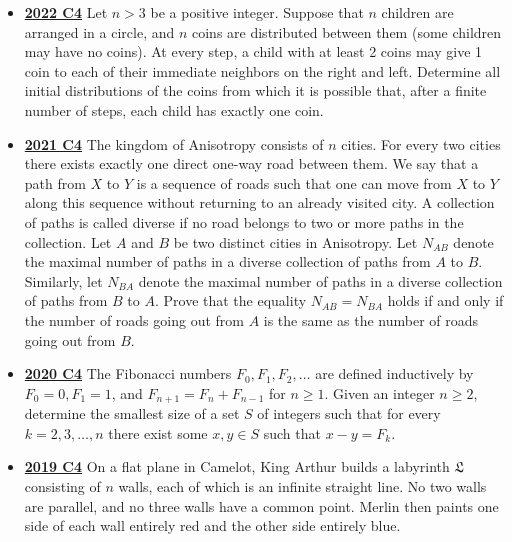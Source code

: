 \documentclass[11pt]{scrartcl}
\begin{document}
\begin{itemize}[leftmargin=*]
Determine the smallest number of pieces Paul needs to make in order to accomplish this.
\item \href{https://artofproblemsolving.com/community/c6h3107331p28104263}{\textbf{2022 C4}} Let $n > 3$ be a positive integer. Suppose that $n$ children are arranged in a circle, and $n$ coins are distributed between them (some children may have no coins). At every step, a child with at least 2 coins may give 1 coin to each of their immediate neighbors on the right and left. Determine all initial distributions of the coins from which it is possible that, after a finite number of steps, each child has exactly one coin. 
\item \href{https://artofproblemsolving.com/community/c6h2882594p25627941}{\textbf{2021 C4}} The kingdom of Anisotropy consists of $n$ cities. For every two cities there exists exactly one direct one-way road between them. We say that a path from $X$ to $Y$ is a sequence of roads such that one can move from $X$ to $Y$ along this sequence without returning to an already visited city. A collection of paths is called diverse if no road belongs to two or more paths in the collection.
Let $A$ and $B$ be two distinct cities in Anisotropy. Let $N_{AB}$ denote the maximal number of paths in a diverse collection of paths from $A$ to $B$. Similarly, let $N_{BA}$ denote the maximal number of paths in a diverse collection of paths from $B$ to $A$. Prove that the equality $N_{AB} = N_{BA}$ holds if and only if the number of roads going out from $A$ is the same as the number of roads going out from $B$. 

\newpage

\item \href{https://artofproblemsolving.com/community/c6h2625914p22698447}{\textbf{2020 C4}} 	The Fibonacci numbers $F_0, F_1, F_2, \dots $ are defined inductively by $F_0=0, F_1=1$, and $F_{n+1}=F_n+F_{n-1}$ for $n \geqslant 1$. Given an integer $n \geqslant 2$, determine the smallest size of a set $S$ of integers such that for every $k=2, 3, \dots , n$ there exist some $x, y \in S$ such that $x-y=F_k$. 

\item \href{https://artofproblemsolving.com/community/c6h2279023p17829075}{\textbf{2019 C4}} On a flat plane in Camelot, King Arthur builds a labyrinth $\mathfrak{L}$ consisting of $n$ walls, each of which is an infinite straight line. No two walls are parallel, and no three walls have a common point. Merlin then paints one side of each wall entirely red and the other side entirely blue.


\end{itemize}
\end{document}
